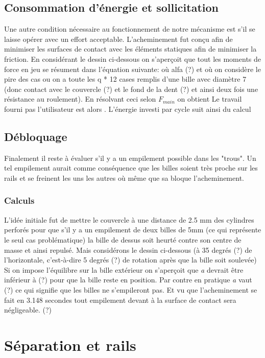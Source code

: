 \subsection{Consommation d'énergie et sollicitation}
Une autre condition nécessaire au fonctionnement de notre mécanisme est s'il se laisse opérer avec un effort acceptable. L'acheminement fut conçu afin de minimiser les surfaces de contact avec les éléments statiques afin de minimiser la friction. En considérant le dessin ci-dessous on s'aperçoit que tout les moments de force en jeu se résument dans l'équation suivante:
où alfa (?) %
et où on considère le pire des cas ou on a toute les q * 12 cases remplis d'une bille avec diamètre 7 (donc contact avec le couvercle (?) et le fond de la dent (?) et ainsi deux fois une résistance au roulement).
En résolvant ceci selon $F_{main}$ on obtient
Le travail fourni pas l'utilisateur est alors 
.
L'énergie investi par cycle suit ainsi du calcul
\subsection{Débloquage}
Finalement il reste à évaluer s'il y a un empilement possible dans les "trous". Un tel empilement aurait comme conséquence que les billes soient très proche sur les rails et se freinent les uns  les autres où même que sa bloque l'acheminement.
\subsubsection{Calculs}
L'idée initiale fut de mettre le couvercle à une distance de 2.5 mm des cylindres perforés pour que s'il y a un empilement de deux billes de 5mm (ce qui représente le seul cas problématique) la bille de dessus soit heurté contre son centre de masse et ainsi repulsé.
Mais considérons le dessin ci-dessous (à 35 degrés (?) de l'horizontale, c'est-à-dire 5 degrés (?) de rotation après que la bille soit soulevée)
Si on impose l'équilibre sur la bille extérieur
on s'aperçoit que \textit{a} devrait être inférieur à (?) pour que la bille reste en position. Par contre en pratique \textit{a} vaut (?) ce qui signifie que les billes ne s'empileront pas. Et vu que l'acheminement se fait en 3.148 secondes tout empilement devant à la surface de contact sera négligeable. (?)

\section{Séparation et rails}


